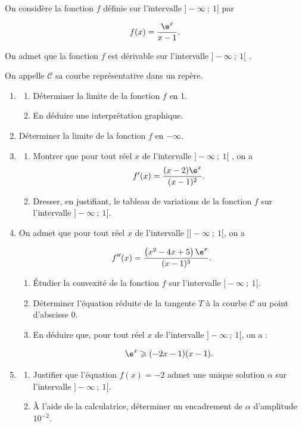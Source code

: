 \medskip

On considère la fonction $f$ définie sur l'intervalle $]-\infty~;~1[$ par 

\[f(x) = \dfrac{\e^x}{x - 1}.\]

On admet que la fonction $f$ est dérivable sur l'intervalle $]-\infty~;~1[$ .

On appelle $\mathcal{C}$ sa courbe représentative dans un repère.

\medskip

\begin{enumerate}
\item 
	\begin{enumerate}
		\item Déterminer la limite de la fonction $f$ en 1.
		\item En déduire une interprétation graphique.
	\end{enumerate}
\item Déterminer la limite de la fonction $f$ en $-\infty$.
\item 
	\begin{enumerate}
		\item Montrer que pour tout réel $x$ de l'intervalle $]-\infty~;~1[$ , on a 
		\[f'(x) = \dfrac{(x - 2)\e^x}{(x - 1)^2}.\]
		
		\item Dresser, en justifiant, le tableau de variations de la fonction $f$ sur l'intervalle $]-\infty~;~1[$.

	\end{enumerate}
\item On admet que pour tout réel $x$ de l'intervalle ]$]-\infty~;~1[$, on a 

\[f''(x) = \dfrac{\left(x^2 -4x + 5\right)\e^x}{(x - 1)^3}.\]

	\begin{enumerate}
		\item Étudier la convexité de la fonction $f$ sur l'intervalle $]-\infty~;~1[$.
		\item Déterminer l'équation réduite de la tangente $T$ à la courbe $\mathcal{C}$ au point d'abscisse 0.
		\item En déduire que, pour tout réel $x$ de l'intervalle $]-\infty~;~1[$, on a :
		
\[\e^x \geqslant  (-2x - 1)(x-1).\]

	\end{enumerate}
\item 
	\begin{enumerate}
		\item Justifier que l'équation $f(x) = -2$ admet une unique solution $\alpha$ sur l'intervalle $]-\infty~;~1[$.
		\item À l'aide de la calculatrice, déterminer un encadrement de $\alpha$ d'amplitude $10^{-2}$.
	\end{enumerate}
\end{enumerate}

\medskip
